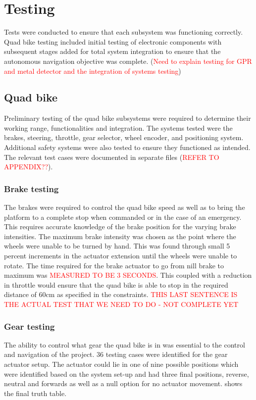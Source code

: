 \documentclass[main.tex]{subfiles}
\begin{document}
\chapter{Testing}
Tests were conducted to ensure that each subsystem was functioning correctly. Quad bike testing included initial testing of electronic components with subsequent stages added for total system integration to ensure that the autonomous navigation objective was complete.
(\textcolor{red}{Need to explain testing for GPR and metal detector and the integration of systems testing})

\section{Quad bike}
Preliminary testing of the quad bike subsystems were required to determine their working range, functionalities and integration. The systems tested were the brakes, steering, throttle, gear selector, wheel encoder, and positioning system. Additional safety systems were also tested to ensure they functioned as intended.
The relevant test cases were documented in separate files (\textcolor{red}{REFER TO APPENDIX??}).

\subsection{Brake testing}
The brakes were required to control the quad bike speed as well as to bring the platform to a complete stop when commanded or in the case of an emergency. This requires accurate knowledge of the brake position for the varying brake intensities. The maximum brake intensity was chosen as the point where the wheels were unable to be turned by hand. This was found through small 5 percent increments in the actuator extension until the wheels were unable to rotate. The time required for the brake actuator to go from nill brake to maximum was \textcolor{red}{MEASURED TO BE 3 SECONDS}. This coupled with a reduction in throttle would ensure that the quad bike is able to stop in the required distance of 60cm as specified in the constraints. \textcolor{red}{THIS LAST SENTENCE IS THE ACTUAL TEST THAT WE NEED TO DO - NOT COMPLETE YET}

\subsection{Gear testing}
The ability to control what gear the quad bike is in was essential to the control and navigation of the project. 36 testing cases were identified for the gear actuator setup. The actuator could lie in one of nine possible positions which were identified based on the system set-up and had three final positions, reverse, neutral and forwards as well as a null option for no actuator movement.  shows the final truth table.
\end{document}
